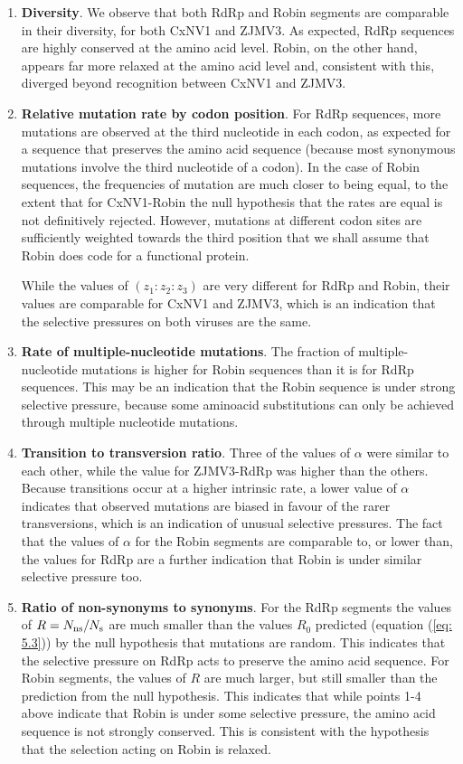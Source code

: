 \documentclass[unnumsec,webpdf,contemporary,large]{oup-authoring-template}%
\theoremstyle{thmstyleone}%
\theoremstyle{thmstyletwo}%
\theoremstyle{thmstylethree}%
\begin{document}
\begin{enumerate}

\item{\bf Diversity}. We observe that both RdRp and Robin
segments are comparable in their diversity, for both CxNV1 and ZJMV3.
As expected, RdRp sequences are highly conserved at the amino acid level.
Robin, on the other hand, appears far more relaxed at the amino acid level and, consistent with this, diverged beyond recognition between CxNV1 and ZJMV3.

\item{\bf Relative mutation rate by codon position}. For RdRp sequences, more mutations are observed
at the third nucleotide in each codon, as expected for a sequence that preserves the amino acid sequence
(because most synonymous mutations involve the third nucleotide of a codon). In the case of Robin sequences,
the frequencies of mutation are much closer to being equal, to the extent that for CxNV1-Robin the null hypothesis
that the rates are equal is not definitively rejected. However, mutations at different
codon sites are sufficiently weighted towards the third position that we shall assume that Robin
does code for a functional protein.

While the values of $(z_1:z_2:z_3)$ are very different for RdRp and Robin, their values are
comparable for CxNV1 and ZJMV3, which is an indication that the selective pressures on both
viruses are the same.

\item{\bf Rate of multiple-nucleotide mutations}. The fraction of multiple-nucleotide mutations is
higher for Robin sequences than it is for RdRp sequences. This may be an indication that the Robin sequence
is under strong selective pressure, because some aminoacid substitutions can only be achieved
through multiple nucleotide mutations.

\item{\bf Transition to transversion ratio}. Three of the values of $\alpha$ were similar to each other, while the value
for ZJMV3-RdRp was higher than the others. Because transitions occur at a higher intrinsic rate, a lower
value of $\alpha$ indicates that observed mutations are biased in favour of the rarer transversions,
which is an indication of unusual selective pressures. The fact that the values of $\alpha$ for the Robin segments are
comparable to, or lower than, the values for RdRp are a further indication that Robin
is under similar selective pressure too.

\item{\bf Ratio of non-synonyms to synonyms}. For the RdRp segments the values of
$R=N_{\rm ns}/N_{\rm s}$ are much smaller than the values $R_0$
predicted (equation (\ref{eq: 5.3})) by the null hypothesis that mutations are random. This indicates that the selective
pressure on RdRp acts to preserve the amino acid sequence. For Robin segments, the values of $R$
are much larger, but still smaller than the prediction from the null hypothesis. This indicates that while
points 1-4 above indicate that Robin is under some selective pressure, the amino acid sequence
is not strongly conserved.
This is consistent with the hypothesis that the selection acting on Robin is relaxed.


\end{enumerate}
\end{document}
